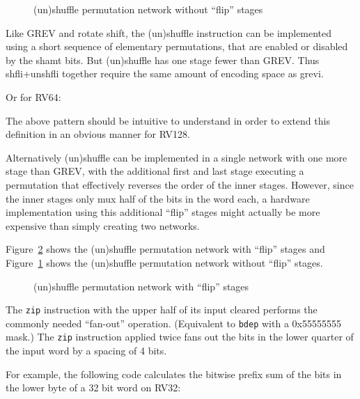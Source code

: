 \begin{figure}[t]
\begin{center}

\end{center}
\caption{(un)shuffle permutation network without ``flip'' stages}
\label{permnet-gzip-noflip}
\end{figure}

Like GREV and rotate shift, the (un)shuffle instruction can be implemented using a short
sequence of elementary permutations, that are enabled or disabled by the shamt
bits. But (un)shuffle has one stage fewer than GREV. Thus shfli+unshfli together require
the same amount of encoding space as grevi.



Or for RV64:



The above pattern should be intuitive to understand in order to extend
this definition in an obvious manner for RV128.

Alternatively (un)shuffle can be implemented in a single network with one more
stage than GREV, with the additional first and last stage executing a
permutation that effectively reverses the order of the inner stages. However,
since the inner stages only mux half of the bits in the word each, a hardware
implementation using this additional ``flip'' stages might actually be more
expensive than simply creating two networks.



Figure~\ref{permnet-gzip-flip} shows the (un)shuffle permutation network with
``flip'' stages and Figure~\ref{permnet-gzip-noflip} shows the (un)shuffle
permutation network without ``flip'' stages.

\begin{figure}[t]
\begin{center}

\end{center}
\caption{(un)shuffle permutation network with ``flip'' stages}
\label{permnet-gzip-flip}
\end{figure}

The \texttt{zip} instruction with the upper half of its input cleared performs
the commonly needed ``fan-out'' operation. (Equivalent to {\tt bdep} with a
0x55555555 mask.) The \texttt{zip} instruction applied twice fans out the bits
in the lower quarter of the input word by a spacing of 4 bits.

For example, the following code calculates the bitwise prefix sum of the bits
in the lower byte of a 32 bit word on RV32:

